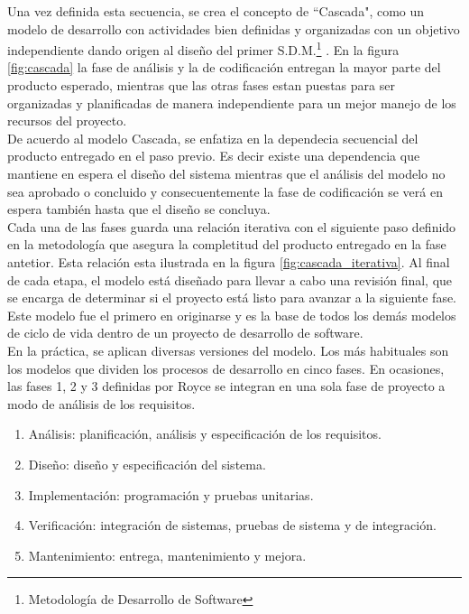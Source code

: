 Una vez definida esta secuencia, se crea el concepto de ``Cascada", como un modelo de desarrollo con actividades bien definidas y organizadas con un objetivo independiente dando origen al diseño del primer S.D.M.\footnote{Metodología de Desarrollo de Software} \cite{Bell&Thayer}. En la figura \ref{fig:cascada} la fase de análisis y la de codificación entregan la mayor parte del producto esperado, mientras que las otras fases estan puestas para ser organizadas y planificadas de manera independiente para un mejor manejo de los recursos del proyecto.\\

De acuerdo al modelo Cascada, se enfatiza en la dependecia secuencial del producto entregado en el paso previo. Es decir existe una dependencia que mantiene en espera el diseño del sistema mientras que el análisis del modelo no sea aprobado o concluido y consecuentemente la fase de codificación se verá en espera también hasta que el diseño se concluya.\\

Cada una de las fases guarda una relación iterativa con el siguiente paso definido en la metodología que asegura la completitud del producto entregado en la fase antetior. Esta relación esta ilustrada en la figura \ref{fig:cascada_iterativa}. Al final de cada etapa, el modelo está diseñado para llevar a cabo una revisión final, que se encarga de determinar si el proyecto está listo para avanzar a la siguiente fase. Este modelo fue el primero en originarse y es la base de todos los demás modelos de ciclo de vida dentro de un proyecto de desarrollo de software.\\

En la práctica, se aplican diversas versiones del modelo. Los más habituales son los modelos que dividen los procesos de desarrollo en cinco fases. En ocasiones, las fases 1, 2 y 3 definidas por Royce se integran en una sola fase de proyecto a modo de análisis de los requisitos.\\

\begin{enumerate}
    \item Análisis: planificación, análisis y especificación de los requisitos.
    \item Diseño: diseño y especificación del sistema.
    \item Implementación: programación y pruebas unitarias.
    \item Verificación: integración de sistemas, pruebas de sistema y de integración.
    \item Mantenimiento: entrega, mantenimiento y mejora.
\end{enumerate}

